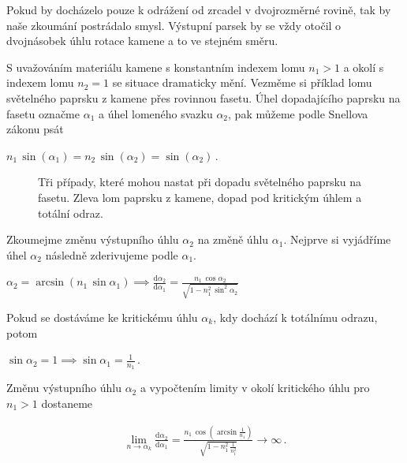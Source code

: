 Pokud by docházelo pouze k odrážení od zrcadel v dvojrozměrné rovině, tak by naše zkoumání postrádalo smysl. Výstupní parsek by se vždy otočil o dvojnásobek úhlu rotace kamene a to ve stejném směru. 

S uvažováním materiálu kamene s konstantním indexem lomu $ n_1>1 $ a okolí s indexem lomu $ n_2 = 1 $ se situace dramaticky mění. Vezměme si příklad lomu světelného paprsku z kamene přes rovinnou fasetu. Úhel dopadajícího paprsku na fasetu označme $\alpha_1$ a úhel lomeného svazku $\alpha_2$, pak můžeme podle Snellova zákonu psát

\begin{center}
$n_1\,\sin(\alpha_1) = n_2\,\sin(\alpha_2) = \sin(\alpha_2)\,.$
\end{center}

\begin{figure}[h!]
\begin{center}
\scalebox{.9}{ }
\end{center}
\caption{Tři případy, které mohou nastat při dopadu světelného paprsku na fasetu. Zleva lom paprsku z kamene, dopad pod kritickým úhlem a totální odraz.}
\label{fig:lom ven }
\end{figure}

Zkoumejme změnu výstupního úhlu $\alpha_2$ na změně úhlu $\alpha_1$. Nejprve si vyjádříme úhel $\alpha_2$ následně zderivujeme podle $\alpha_1$. 

\begin{center}
$\alpha_2 = \arcsin(n_1\,\sin\alpha_1) \implies \frac{\mathrm{d}\alpha_2}{\mathrm{d}\alpha_1}= \frac{n_1\,\cos\alpha_2}{\sqrt{1-n_1^2\,\sin^2\alpha_2}}$
\end{center}

Pokud se dostáváme ke kritickému úhlu $\alpha_k$, kdy dochází k totálnímu odrazu, potom

\begin{center}
 $	\sin\alpha_2 = 1 \implies \sin\alpha_1 = \frac{1}{n_1}\,. $
\end{center}

Změnu výstupního úhlu $\alpha_2$ a vypočtením limity v okolí kritického úhlu pro $ n_1>1$ dostaneme 

\begin{eqnarray}
\lim_{n \to \alpha_k}\frac{\mathrm{d}\alpha_2}{\mathrm{d}\alpha_1} = \frac{n_1\,\cos(\arcsin\frac{1}{n_1})}{\sqrt{1-n_1^2\,\frac{1}{n_1^2}}} \to \infty\,.
\label{eq:zmena velikosti posunu}  
\end{eqnarray}

